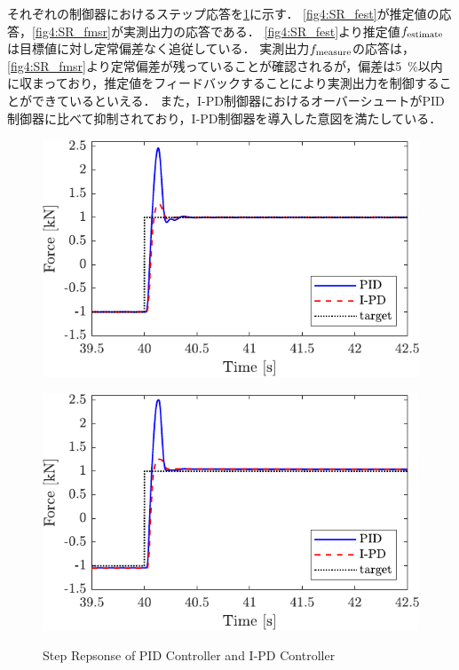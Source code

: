 それぞれの制御器におけるステップ応答を\figname\ref{fig4:SRofPIDandIPD}に示す．
\figname\ref{fig4:SR_fest}が推定値の応答，\figname\ref{fig4:SR_fmsr}が実測出力の応答である．
\figname\ref{fig4:SR_fest}より推定値$f_\mathrm{estimate}$は目標値に対し定常偏差なく追従している．
実測出力$f_\mathrm{measure}$の応答は，\figname\ref{fig4:SR_fmsr}より定常偏差が残っていることが確認されるが，偏差は\SI{5}{\%}以内に収まっており，推定値をフィードバックすることにより実測出力を制御することができているといえる．
また，I-PD制御器におけるオーバーシュートがPID制御器に比べて抑制されており，I-PD制御器を導入した意図を満たしている．

\begin{figure}[tbp]
    \begin{minipage}{0.45\hsize}
        \centering
        \includegraphics[keepaspectratio, width = \linewidth]{contents/ForceControl/figure/1115_PIDandI-PDestforce_step.pdf}
        \label{fig4:SR_fest}
    \end{minipage}
    \begin{minipage}{0.45\hsize}
        \centering
        \includegraphics[keepaspectratio, width = \linewidth]{contents/ForceControl/figure/1115_PIDandI-PDforce_step.pdf}
        \label{fig4:SR_fmsr}
    \end{minipage}
    \caption{Step Repsonse of PID Controller and I-PD Controller}
    \label{fig4:SRofPIDandIPD}
\end{figure}


